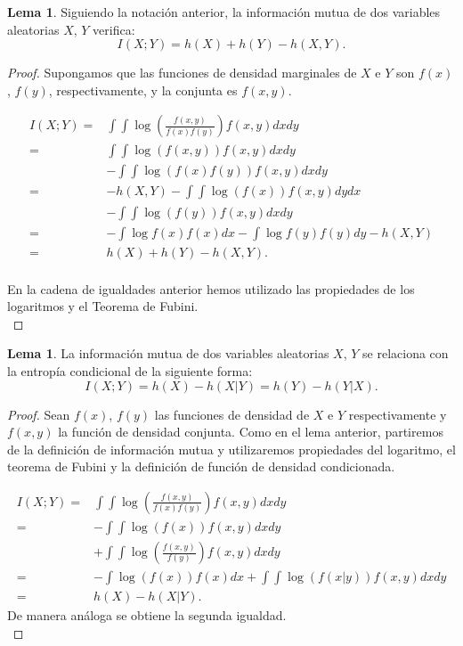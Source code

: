 \documentclass[12pt,a4paper]{report} %
\theoremstyle{definition}
\newtheorem{lemma}[theorem]{Lema}
\begin{document}
\begin{lemma}\label{l:ent_im}
  Siguiendo la notación anterior, la información mutua de dos variables aleatorias $X$, $Y$ verifica:\[
  I(X;Y) = h(X) + h(Y) - h(X,Y).
  \]
\end{lemma}

\begin{proof}
  Supongamos que las funciones de densidad marginales de $X$ e $Y$ son $f(x)$, $f(y)$, respectivamente, y la conjunta es $f(x,y)$.

  \begin{align*}
    I(X;Y) =& \int \int  \log \left(\frac{f(x,y)}{f(x)f(y)}\right)f(x,y)dxdy \\[3pt]
    =& \int \int  \log \left(f(x,y)\right)f(x,y)dxdy\\
    &- \int \int  \log \left(f(x)f(y)\right) f(x,y)dxdy\\[3pt]
    =& -h(X,Y)-\int\int \log \left(f(x)\right)f(x,y)  dy dx\\
    &- \int \int \log \left(f(y)\right)f(x,y)dxdy\\[3pt]
    =& -\int  \log f(x)f(x)dx - \int \log f(y) f(y)dy -h(X,Y)\\[3pt]
    =& h(X) + h(Y) - h(X,Y).\\[-10pt]
  \end{align*}

En la cadena de igualdades anterior hemos utilizado las propiedades de los logaritmos y el Teorema de Fubini.\\
\end{proof}

\begin{lemma}
  La información mutua de dos variables aleatorias $X$, $Y$ se relaciona con la entropía condicional de la siguiente forma:\[
I(X;Y) = h(X) - h(X|Y) = h(Y) - h(Y|X).
  \]
\end{lemma}

\begin{proof}
  Sean $f(x)$, $f(y)$ las funciones de densidad de $X$ e $Y$ respectivamente y $f(x,y)$ la función de densidad conjunta.
  Como en el lema anterior, partiremos de la definición de información mutua y utilizaremos propiedades del logaritmo, el teorema de Fubini y la definición de función de densidad condicionada.
  
  \begin{align*}
    I(X;Y)=& \int \int  \log\left( \frac{f(x,y)}{f(x)f(y)}\right)f(x,y)dxdy \\[3pt]
    =& - \int\int \log \left(f(x)\right)f(x,y)  dx dy\\ &+ \int\int\log \left(\frac{f(x,y)}{f(y)}\right)  f(x,y)dx dy\\[3pt]
    =& - \int  \log \left(f(x)\right)f(x) dx + \int\int \log \left(f(x|y)\right)f(x,y) dx dy\\  
    =& h(X) - h(X|Y).
  \end{align*}
De manera análoga se obtiene la segunda igualdad.\\
\end{proof}
\end{document}
